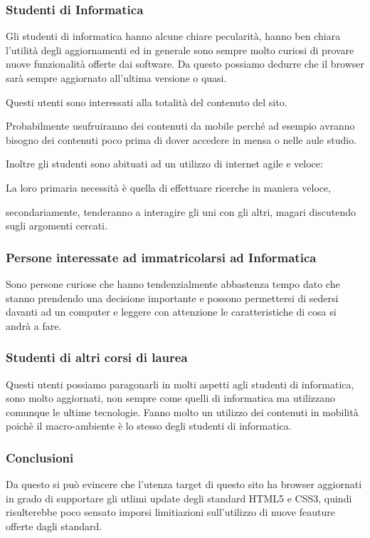 \subsubsection{Studenti di Informatica}

Gli studenti di informatica hanno alcune chiare pecularità, hanno ben chiara l'utilità degli aggiornamenti ed in generale sono sempre molto curiosi di provare nuove funzionalità offerte dai software. Da questo possiamo dedurre che il browser sarà sempre aggiornato all'ultima versione o quasi.

Questi utenti sono interessati alla totalità del contenuto del sito.

Probabilmente usufruiranno dei contenuti da mobile perché ad esempio avranno bisogno dei contenuti poco prima di dover accedere in mensa o nelle aule studio.

Inoltre gli studenti sono abituati ad un utilizzo di internet agile e veloce:

La loro primaria necessità è quella di effettuare ricerche in maniera veloce, 

secondariamente, tenderanno a interagire gli uni con gli altri, magari discutendo sugli argomenti cercati.


\subsubsection{Persone interessate ad immatricolarsi ad Informatica}
Sono persone curiose che hanno tendenzialmente abbastenza tempo dato che stanno prendendo una decisione importante e possono permettersi di sedersi davanti ad un computer e leggere con attenzione le caratteristiche di cosa si andrà a fare.


\subsubsection{Studenti di altri corsi di laurea}
Questi utenti possiamo paragonarli in molti aspetti agli studenti di informatica, sono molto aggiornati, non sempre come quelli di informatica ma utilizzano comunque le ultime tecnologie. Fanno molto un utilizzo dei contenuti in mobilità poichè il macro-ambiente è lo stesso degli studenti di informatica.


\subsubsection{Conclusioni}
Da questo si può evincere che l'utenza target di questo sito ha browser aggiornati in grado di supportare gli utlimi update degli standard HTML5 e CSS3, quindi risulterebbe poco sensato imporsi limitiazioni sull'utilizzo di nuove feauture offerte dagli standard.
